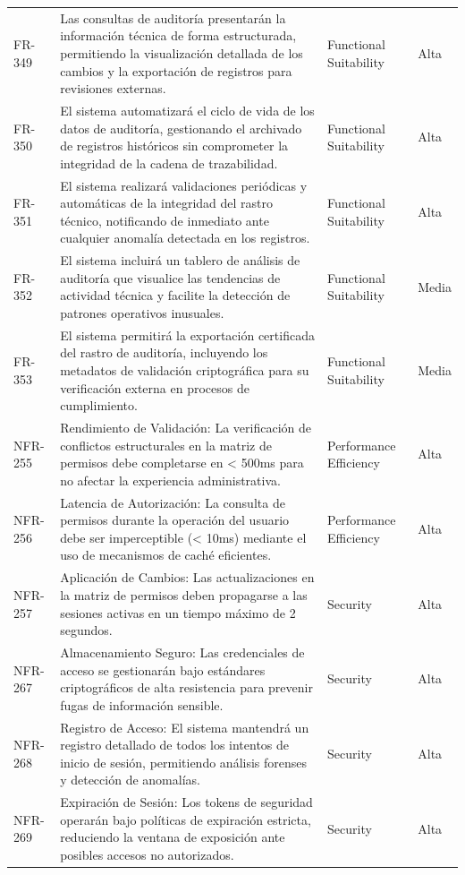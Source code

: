 \begin{longtable}{>{\raggedright\arraybackslash}p{} >{\raggedright\arraybackslash}p{} >{\raggedright\arraybackslash}p{} >{\raggedright\arraybackslash}p{}}
FR-349 & Las consultas de auditoría presentarán la información técnica de forma estructurada, permitiendo la visualización detallada de los cambios y la exportación de registros para revisiones externas. & Functional Suitability & Alta \\
FR-350 & El sistema automatizará el ciclo de vida de los datos de auditoría, gestionando el archivado de registros históricos sin comprometer la integridad de la cadena de trazabilidad. & Functional Suitability & Alta \\
FR-351 & El sistema realizará validaciones periódicas y automáticas de la integridad del rastro técnico, notificando de inmediato ante cualquier anomalía detectada en los registros. & Functional Suitability & Alta \\
FR-352 & El sistema incluirá un tablero de análisis de auditoría que visualice las tendencias de actividad técnica y facilite la detección de patrones operativos inusuales. & Functional Suitability & Media \\
FR-353 & El sistema permitirá la exportación certificada del rastro de auditoría, incluyendo los metadatos de validación criptográfica para su verificación externa en procesos de cumplimiento. & Functional Suitability & Media \\
NFR-255 & Rendimiento de Validación: La verificación de conflictos estructurales en la matriz de permisos debe completarse en < 500ms para no afectar la experiencia administrativa. & Performance Efficiency & Alta \\
NFR-256 & Latencia de Autorización: La consulta de permisos durante la operación del usuario debe ser imperceptible (< 10ms) mediante el uso de mecanismos de caché eficientes. & Performance Efficiency & Alta \\
NFR-257 & Aplicación de Cambios: Las actualizaciones en la matriz de permisos deben propagarse a las sesiones activas en un tiempo máximo de 2 segundos. & Security & Alta \\
NFR-267 & Almacenamiento Seguro: Las credenciales de acceso se gestionarán bajo estándares criptográficos de alta resistencia para prevenir fugas de información sensible. & Security & Alta \\
NFR-268 & Registro de Acceso: El sistema mantendrá un registro detallado de todos los intentos de inicio de sesión, permitiendo análisis forenses y detección de anomalías. & Security & Alta \\
NFR-269 & Expiración de Sesión: Los tokens de seguridad operarán bajo políticas de expiración estricta, reduciendo la ventana de exposición ante posibles accesos no autorizados. & Security & Alta \\

\end{longtable}
